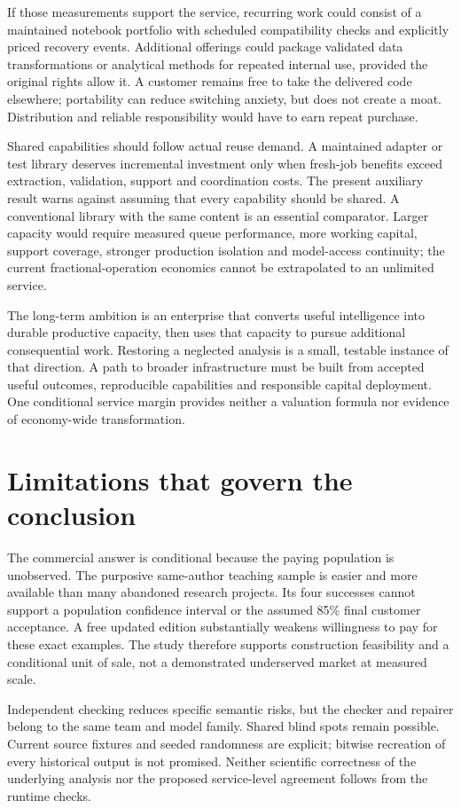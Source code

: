If those measurements support the service, recurring work could consist of a maintained notebook portfolio with scheduled compatibility checks and explicitly priced recovery events. Additional offerings could package validated data transformations or analytical methods for repeated internal use, provided the original rights allow it. A customer remains free to take the delivered code elsewhere; portability can reduce switching anxiety, but does not create a moat. Distribution and reliable responsibility would have to earn repeat purchase.

Shared capabilities should follow actual reuse demand. A maintained adapter or test library deserves incremental investment only when fresh-job benefits exceed extraction, validation, support and coordination costs. The present auxiliary result warns against assuming that every capability should be shared. A conventional library with the same content is an essential comparator. Larger capacity would require measured queue performance, more working capital, support coverage, stronger production isolation and model-access continuity; the current fractional-operation economics cannot be extrapolated to an unlimited service.

The long-term ambition is an enterprise that converts useful intelligence into durable productive capacity, then uses that capacity to pursue additional consequential work. Restoring a neglected analysis is a small, testable instance of that direction. A path to broader infrastructure must be built from accepted useful outcomes, reproducible capabilities and responsible capital deployment. One conditional service margin provides neither a valuation formula nor evidence of economy-wide transformation.

\section{Limitations that govern the conclusion}
The commercial answer is conditional because the paying population is unobserved. The purposive same-author teaching sample is easier and more available than many abandoned research projects. Its four successes cannot support a population confidence interval or the assumed 85\% final customer acceptance. A free updated edition substantially weakens willingness to pay for these exact examples. The study therefore supports construction feasibility and a conditional unit of sale, not a demonstrated underserved market at measured scale.

Independent checking reduces specific semantic risks, but the checker and repairer belong to the same team and model family. Shared blind spots remain possible. Current source fixtures and seeded randomness are explicit; bitwise recreation of every historical output is not promised. Neither scientific correctness of the underlying analysis nor the proposed service-level agreement follows from the runtime checks.


